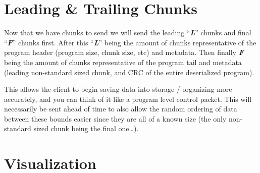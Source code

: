 \documentclass{article}
\newcommand{\textbfit}[1]{\textbf{\textit{#1}}} %
\begin{document}
    \newpage
    \section{Leading \& Trailing Chunks}

    Now that we have chunks to send we will send the leading ``\textbfit{L}'' chunks and final ``\textbfit{F}'' chunks first. After this ``\textbfit{L}'' being the amount of chunks representative of the program header (program size, chunk size, etc) and metadata. Then finally \textbfit{F} being the amount of chunks representative of the program tail and metadata (leading non-standard sized chunk, and CRC of the entire deserialized program).

    \bigskip
    This allows the client to begin saving data into storage / organizing more accurately, and you can think of it like a program level control packet. This will necessarily be sent ahead of time to also allow the random ordering of data between these bounds easier since they are all of a known size (the only non-standard sized chunk being the final one…).

    \section{Visualization}
\end{document}
